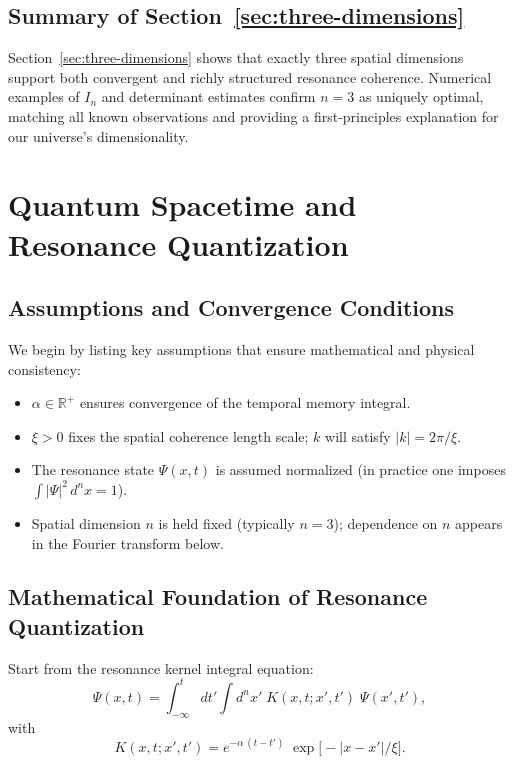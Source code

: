 \subsection{Summary of Section~\ref{sec:three-dimensions}}
\label{sec:summary-3d}

Section~\ref{sec:three-dimensions} shows that exactly three spatial dimensions support both convergent and richly structured resonance coherence. Numerical examples of \(I_n\) and determinant estimates confirm \(n=3\) as uniquely optimal, matching all known observations and providing a first‐principles explanation for our universe’s dimensionality.

\section{Quantum Spacetime and Resonance Quantization}
\label{sec:quantum-spacetime}

\subsection{Assumptions and Convergence Conditions}
\label{sec:quantum-assumptions}
We begin by listing key assumptions that ensure mathematical and physical consistency:
\begin{itemize}
  \item \(\alpha \in \mathbb{R}^+\) ensures convergence of the temporal memory integral.
  \item \(\xi > 0\) fixes the spatial coherence length scale; \(k\) will satisfy \(|k| = 2\pi/\xi\).
  \item The resonance state \(\Psi(x,t)\) is assumed normalized (in practice one imposes \(\int |\Psi|^2\,d^n x = 1\)).
  \item Spatial dimension \(n\) is held fixed (typically \(n=3\)); dependence on \(n\) appears in the Fourier transform below.
\end{itemize}

\subsection{Mathematical Foundation of Resonance Quantization}
\label{sec:quantum-kernel-equation}

Start from the resonance kernel integral equation:
\begin{equation}
\Psi(x,t) 
= \int_{-\infty}^{t} dt' \int d^n x'\; K(x,t;x',t')\;\Psi(x',t'),
\label{eq:kernel-integral}
\end{equation}
with
\begin{equation}
K(x,t;x',t')
= e^{-\alpha\,(t - t')}\;\exp\!\bigl[-|x - x'|/\xi\bigr].
\label{eq:memory-kernel}
\end{equation}

